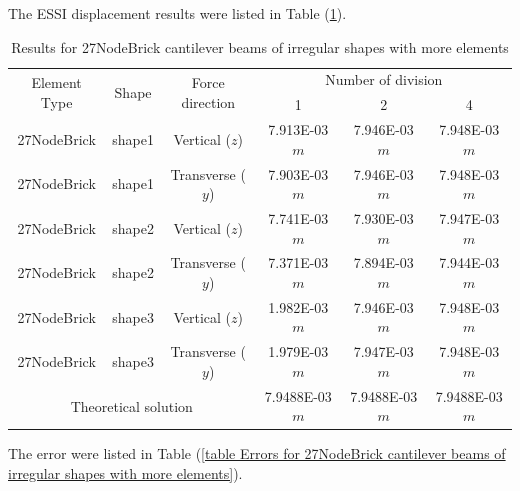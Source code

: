 \documentclass[fleqn,11pt]{article}
\begin{document}
The ESSI displacement results were listed in Table (\ref{table Results for 27NodeBrick cantilever beams of irregular shapes with more elements}).
\begin{table}[H]
  \centering
  \caption{Results for 27NodeBrick cantilever beams of irregular shapes with more elements}
  \label{table Results for 27NodeBrick cantilever beams of irregular shapes with more elements}
\begin{tabular}{|c|c|c|c|c|c|}
\hline
\multirow{2}{*}{Element Type} & \multirow{2}{*}{Shape}  & \multirow{2}{*}{Force direction}  & \multicolumn{3}{|c|}{Number of division} \\  \cline{4-6}
                        &        &                  &  1 &  2 &  4  \\ \hline
27NodeBrick              & shape1 & Vertical ($z$)   & 7.913E-03 $m$ & 7.946E-03 $m$ & 7.948E-03  $m$ \\ \hline
27NodeBrick              & shape1 & Transverse ($y$) & 7.903E-03 $m$ & 7.946E-03 $m$ & 7.948E-03  $m$ \\ \hline
27NodeBrick              & shape2 & Vertical ($z$)   & 7.741E-03 $m$ & 7.930E-03 $m$ & 7.947E-03  $m$ \\ \hline
27NodeBrick              & shape2 & Transverse ($y$) & 7.371E-03 $m$ & 7.894E-03 $m$ & 7.944E-03  $m$ \\ \hline
27NodeBrick              & shape3 & Vertical ($z$)   & 1.982E-03 $m$ & 7.946E-03 $m$ & 7.948E-03  $m$ \\ \hline
27NodeBrick              & shape3 & Transverse ($y$) & 1.979E-03 $m$ & 7.947E-03 $m$ & 7.948E-03  $m$ \\ \hline
 \multicolumn{3}{|c|}{Theoretical solution}      & 7.9488E-03 $m$  & 7.9488E-03 $m$  & 7.9488E-03  $m$ \\
\hline
\end{tabular}
\end{table}

The error were listed in Table (\ref{table Errors for 27NodeBrick cantilever beams of irregular shapes with more elements}). 
\end{document}
